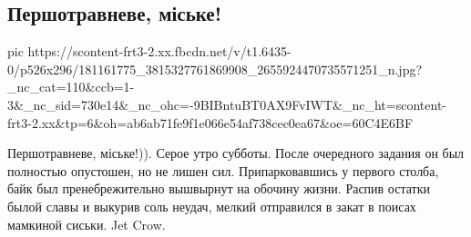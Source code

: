  
 
 
 
 
\subsection{Першотравневе, міське!}

\ifcmt
  pic https://scontent-frt3-2.xx.fbcdn.net/v/t1.6435-0/p526x296/181161775_3815327761869908_2655924470735571251_n.jpg?_nc_cat=110&ccb=1-3&_nc_sid=730e14&_nc_ohc=-9BIBntuBT0AX9FvIWT&_nc_ht=scontent-frt3-2.xx&tp=6&oh=ab6ab71fe9f1e066e54af738cec0ea67&oe=60C4E6BF
\fi

Першотравневе, міське!)). Серое утро субботы. После очередного задания он был
полностью опустошен, но не лишен сил. Припарковавшись у первого столба, байк
был пренебрежительно вышвырнут на обочину жизни. Распив остатки былой славы и
выкурив соль неудач, мелкий отправился в закат в поисах мамкиной сиськи. Jet
Crow.
